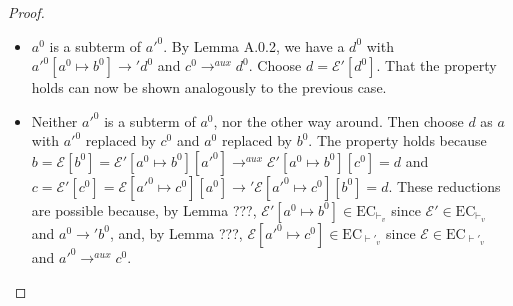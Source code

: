 \begin{proof}
\begin{enumerate}
\begin{enumerate}
\begin{itemize}
\item $a^0$ is a subterm of $a'^0$. By Lemma A.0.2, we have a $d^0$ with $a'^0[a^0 \mapsto b^0] \longrightarrow' d^0$ and $c^0 \longrightarrow^{aux} d^0$. Choose $d = \mathcal{E}'[d^0]$. That the property holds can now be shown analogously to the previous case.

\item Neither $a'^0$ is a subterm of $a^0$, nor the other way around. Then choose $d$ as $a$ with $a'^0$ replaced by $c^0$ and $a^0$ replaced by $b^0$. The property holds because $b = \mathcal{E}[b^0] = \mathcal{E}'[a^0 \mapsto b^0][a'^0] \longrightarrow^{aux} \mathcal{E}'[a^0 \mapsto b^0][c^0] = d$ and $c = \mathcal{E}'[c^0] = \mathcal{E}[a'^0 \mapsto c^0][a^0] \longrightarrow' \mathcal{E}[a'^0 \mapsto c^0][b^0] = d$. These reductions are possible because, by Lemma ???, $\mathcal{E}'[a^0 \mapsto b^0] \in \textrm{EC}_{\vdash_v}$ since $\mathcal{E}' \in \textrm{EC}_{\vdash_v}$ and $a^0 \longrightarrow' b^0$, and, by Lemma ???, $\mathcal{E}[a'^0 \mapsto c^0] \in \textrm{EC}_{\vdash'_v}$ since $\mathcal{E} \in \textrm{EC}_{\vdash'_v}$ and $a'^0 \longrightarrow^{aux} c^0$.
\end{itemize}

\end{enumerate}
\end{enumerate}

\end{proof}

